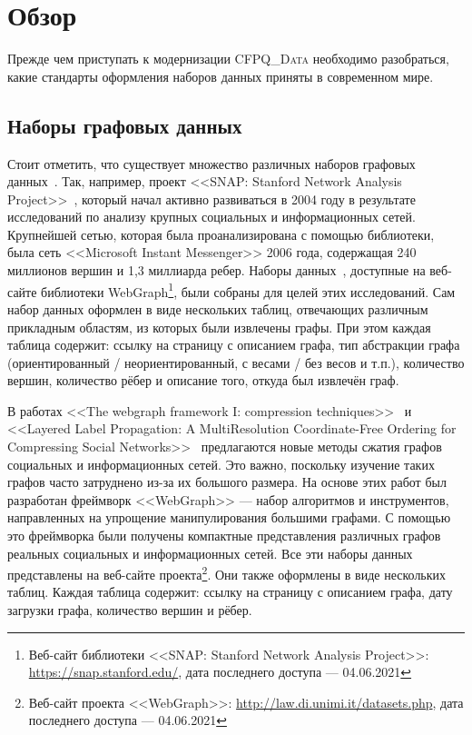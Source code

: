 \section{Обзор}

Прежде чем приступать к модернизации \textsc{CFPQ\_Data} необходимо разобраться, какие стандарты оформления наборов данных приняты в современном мире.

\subsection{Наборы графовых данных}

Стоит отметить, что существует множество различных наборов графовых данных~\cite{BoVWFI, BRSLLP, SNAPDATESETS}.
Так, например, проект <<SNAP: Stanford Network Analysis Project>>~\cite{SNAPDATESETS}, который начал активно развиваться в 2004 году в результате исследований по анализу крупных социальных и информационных сетей.
Крупнейшей сетью, которая была проанализирована с помощью библиотеки, была сеть <<Micro\-soft Instant Messenger>> 2006 года, содержащая 240 миллионов вершин и 1,3 миллиарда ребер.
Наборы данных~\cite{SNAPDATESETS}, доступные на веб-сайте библиотеки WebGraph\footnote{Веб-сайт библиотеки <<SNAP: Stanford Network Analysis Project>>: \url{https://snap.stanford.edu/}, дата последнего доступа --- 04.06.2021}, были собраны для целей этих исследований.
Сам набор данных оформлен в виде нескольких таблиц, отвечающих различным прикладным областям, из которых были извлечены графы.
При этом каждая таблица содержит: ссылку на страницу с описанием графа, тип абстракции графа (ориентированный / неориентированный, с весами / без весов и т.п.), количество вершин, количество рёбер и описание того, откуда был извлечён граф.

В работах <<The webgraph framework I: compression techniques>>~\cite{BoVWFI} и <<Layered Label Propagation: A MultiResolution Coordinate-Free Ordering for Compressing Social Networks>>~\cite{BRSLLP} предлагаются новые методы сжатия графов социальных и информационных сетей.
Это важно, поскольку изучение таких графов часто затруднено из-за их большого размера.
На основе этих работ был разработан фреймворк <<WebGraph>> --- набор алгоритмов и инструментов, направленных на упрощение манипулирования большими графами.
С помощью это фреймворка были получены компактные представления различных графов реальных социальных и информационных сетей.
Все эти наборы данных представлены на веб-сайте проекта\footnote{Веб-сайт проекта <<WebGraph>>: \url{http://law.di.unimi.it/datasets.php}, дата последнего доступа --- 04.06.2021}.
Они также оформлены в виде нескольких таблиц.
Каждая таблица содержит: ссылку на страницу с описанием графа, дату загрузки графа, количество вершин и рёбер.

